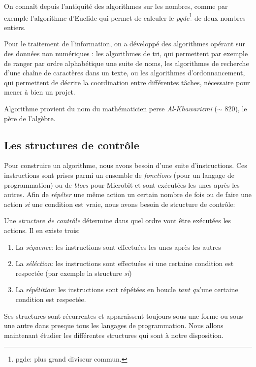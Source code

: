 \documentclass[11pt, a4paper]{book}
\begin{document}
On connaît depuis l'antiquité des algorithmes sur les nombres, comme par exemple l'algorithme d'Euclide qui permet de calculer le {\it pgdc}\footnote{pgdc: plus grand diviseur commun.} de deux nombres entiers.

Pour le traitement de l'information, on a développé des algorithmes opérant sur des données non numériques : les algorithmes de tri, qui permettent par exemple de ranger par ordre alphabétique une suite de noms, les algorithmes de recherche d'une chaîne de caractères dans un texte, ou les algorithmes d'ordonnancement, qui permettent de décrire la coordination entre différentes tâches, nécessaire pour mener à bien un projet.

Algorithme provient du nom du mathématicien perse {\it  Al-Khawarizmi} ($\sim$ 820), le père de l'algèbre.

\subsection{Les structures de contrôle}

Pour construire un algorithme, nous avons besoin d'une suite d'instructions. Ces instructions sont prises parmi un ensemble de {\it fonctions} (pour un langage de programmation) ou de {\it blocs} pour Microbit et sont exécutées les unes après les autres. Afin de {\it répéter} une même action un certain nombre de fois ou de faire une action {\it si} une condition est vraie, nous avons besoin de structure de contrôle:

\begin{defi}
Une {\it structure de contrôle } détermine dans quel ordre vont être exécutées les actions. Il en existe trois:
\begin{enumerate}
\item La {\it séquence}: les instructions sont effectuées les unes après les autres
\item La {\it séléction}: les instructions sont effectuées si une certaine
 condition est respectée (par exemple la structure {\it si})
\item La {\it répétition}: les instructions sont répétées en boucle {\it tant qu}'une certaine condition est respectée.
\end{enumerate}
\end{defi}

Ses structures sont récurrentes et apparaissent toujours sous une forme ou sous une autre dans presque tous les langages de programmation. Nous allons maintenant étudier les différentes structures qui sont à notre disposition.
\end{document}

